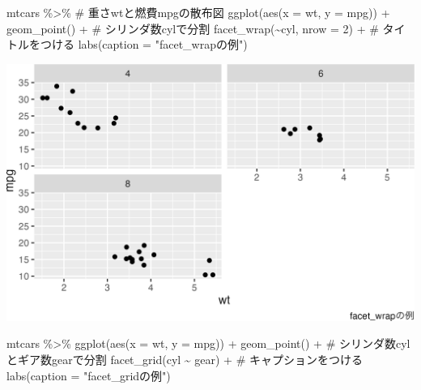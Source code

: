 \documentclass[
  a4paper,
]{book}
\newenvironment{Shaded}{\begin{snugshade}}{\end{snugshade}}
\newcommand{\AttributeTok}[1]{\textcolor[rgb]{0.40,0.45,0.13}{#1}}
\newcommand{\CommentTok}[1]{\textcolor[rgb]{0.37,0.37,0.37}{#1}}
\newcommand{\DecValTok}[1]{\textcolor[rgb]{0.68,0.00,0.00}{#1}}
\newcommand{\FunctionTok}[1]{\textcolor[rgb]{0.28,0.35,0.67}{#1}}
\newcommand{\NormalTok}[1]{\textcolor[rgb]{0.00,0.23,0.31}{#1}}
\newcommand{\SpecialCharTok}[1]{\textcolor[rgb]{0.37,0.37,0.37}{#1}}
\newcommand{\StringTok}[1]{\textcolor[rgb]{0.13,0.47,0.30}{#1}}
\begin{document}
\begin{Shaded}
\begin{Highlighting}[]
\NormalTok{mtcars }\SpecialCharTok{\%\textgreater{}\%}
  \CommentTok{\# 重さwtと燃費mpgの散布図}
  \FunctionTok{ggplot}\NormalTok{(}\FunctionTok{aes}\NormalTok{(}\AttributeTok{x =}\NormalTok{ wt, }\AttributeTok{y =}\NormalTok{ mpg)) }\SpecialCharTok{+}
  \FunctionTok{geom\_point}\NormalTok{() }\SpecialCharTok{+}
  \CommentTok{\# シリンダ数cylで分割}
  \FunctionTok{facet\_wrap}\NormalTok{(}\SpecialCharTok{\textasciitilde{}}\NormalTok{cyl, }\AttributeTok{nrow =} \DecValTok{2}\NormalTok{) }\SpecialCharTok{+}
  \CommentTok{\# タイトルをつける}
  \FunctionTok{labs}\NormalTok{(}\AttributeTok{caption =} \StringTok{"facet\_wrapの例"}\NormalTok{)}
\end{Highlighting}
\end{Shaded}

\includegraphics{chapter04_files/figure-pdf/exampleFacetWrap-1.png}

\begin{Shaded}
\begin{Highlighting}[]
\NormalTok{mtcars }\SpecialCharTok{\%\textgreater{}\%}
  \FunctionTok{ggplot}\NormalTok{(}\FunctionTok{aes}\NormalTok{(}\AttributeTok{x =}\NormalTok{ wt, }\AttributeTok{y =}\NormalTok{ mpg)) }\SpecialCharTok{+}
  \FunctionTok{geom\_point}\NormalTok{() }\SpecialCharTok{+}
  \CommentTok{\# シリンダ数cylとギア数gearで分割}
  \FunctionTok{facet\_grid}\NormalTok{(cyl }\SpecialCharTok{\textasciitilde{}}\NormalTok{ gear) }\SpecialCharTok{+}
  \CommentTok{\# キャプションをつける}
  \FunctionTok{labs}\NormalTok{(}\AttributeTok{caption =} \StringTok{"facet\_gridの例"}\NormalTok{)}
\end{Highlighting}
\end{Shaded}
\end{document}

